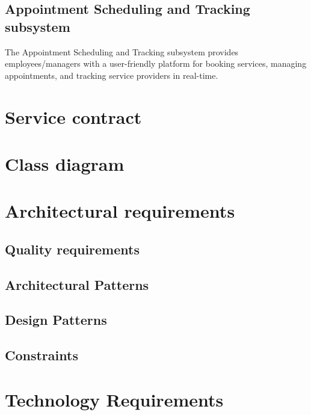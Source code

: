 \documentclass{article}
\begin{document}
	\subsection*{Appointment Scheduling and Tracking subsystem}
	The Appointment Scheduling and Tracking subsystem provides employees/managers with a user-friendly platform for booking services, managing appointments, and tracking service providers in real-time.


	
	\newpage
	
	\section*{Service contract}	
	
	\newpage
	
	\section*{Class diagram}
	
	\newpage
	
	\section*{Architectural requirements}
	
	\subsection*{Quality requirements}	
	\subsection*{Architectural Patterns}	
	\subsection*{Design Patterns}	
	\subsection*{Constraints}	
	
	\newpage
	\section*{Technology Requirements}
	
	
\end{document}
